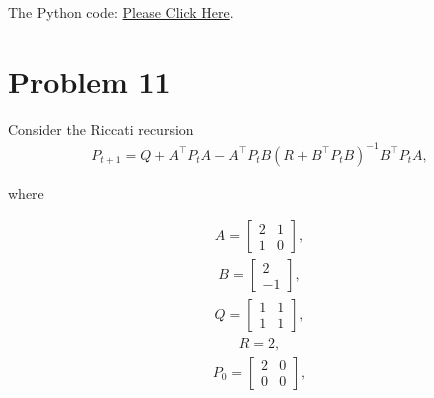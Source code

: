 \documentclass[a4paper,11pt,reqno]{amsart}
\newcommand{\tran}{\intercal}
\begin{document}


The Python code: \href{https://github.com/Chanawesome/ELE8088-EXTRA/blob/main/Problem10.2.py}{Please Click Here}.

\section{Problem 11}
Consider the Riccati recursion
$$
\begin{aligned}
    P_{t+1}=Q+A^{\tran}P_tA-A^{\tran}P_tB(R+B^{\tran}P_tB)^{-1}B^{\tran}P_tA,
\end{aligned}
$$

where

$$
\begin{aligned}
    A = \begin{bmatrix} 2 & 1 \\ 1 & 0 \end{bmatrix},
\end{aligned}
$$
$$
\begin{aligned}
    B = \begin{bmatrix} 2 \\ -1 \end{bmatrix},
\end{aligned}
$$
$$
\begin{aligned}
    Q = \begin{bmatrix} 1 & 1 \\ 1 & 1 \end{bmatrix},
\end{aligned}
$$
$$
\begin{aligned}
    R = 2,
\end{aligned}
$$
$$
\begin{aligned}
    P_0 = \begin{bmatrix} 2 & 0 \\ 0 & 0 \end{bmatrix},
\end{aligned}
$$
\end{document}
